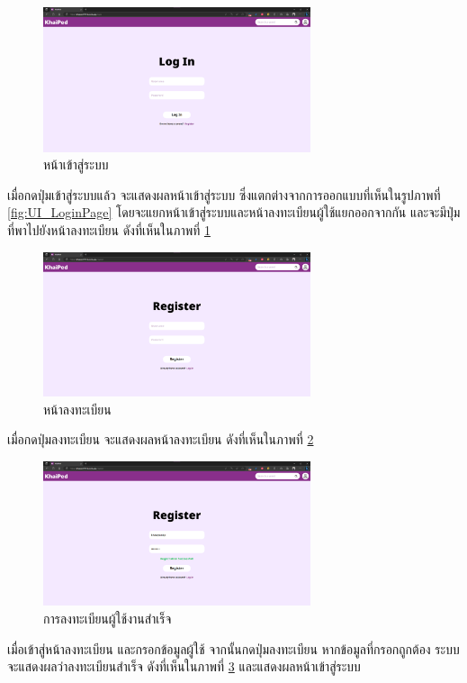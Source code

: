 \documentclass[12pt,oneside,openright,a4paper]{cpe-thai-project}
\begin{document}
\begin{figure}[!h]\centering
	\includegraphics[width=0.7\textwidth, keepaspectratio=true]{image/chap4/UI/login/login.png}
	\caption{{หน้าเข้าสู่ระบบ}}\label{fig:chap4UILogIn}
\end{figure}
\hspace{1cm}
เมื่อกดปุ่มเข้าสู่ระบบแล้ว จะแสดงผลหน้าเข้าสู่ระบบ ซึ่งแตกต่างจากการออกแบบที่เห็นในรูปภาพที่ \ref{fig:UI_LoginPage}
โดยจะแยกหน้าเข้าสู่ระบบและหน้าลงทะเบียนผู้ใช้แยกออกจากกัน และจะมีปุ่มที่พาไปยังหน้าลงทะเบียน ดังที่เห็นในภาพที่ \ref{fig:chap4UILogIn}

\pagebreak
\begin{figure}[!h]\centering
	\includegraphics[width=0.7\textwidth, keepaspectratio=true]{image/chap4/UI/login/register.png}
	\caption{{หน้าลงทะเบียน}}\label{fig:chap4UIRegister}
\end{figure}
\hspace{1cm}
เมื่อกดปุ่มลงทะเบียน จะแสดงผลหน้าลงทะเบียน ดังที่เห็นในภาพที่ \ref{fig:chap4UIRegister}

\begin{figure}[!h]\centering
	\includegraphics[width=0.7\textwidth, keepaspectratio=true]{image/chap4/UI/login/register success.png}
	\caption{{การลงทะเบียนผู้ใช้งานสำเร็จ}}\label{fig:chap4UIRegisterSuccess}
\end{figure}
\hspace{1cm}
เมื่อเข้าสู่หน้าลงทะเบียน และกรอกข้อมูลผู้ใช้ จากนั้นกดปุ่มลงทะเบียน หากข้อมูลที่กรอกถูกต้อง ระบบจะแสดงผลว่าลงทะเบียนสำเร็จ
ดังที่เห็นในภาพที่ \ref{fig:chap4UIRegisterSuccess} และแสดงผลหน้าเข้าสู่ระบบ
\end{document}
